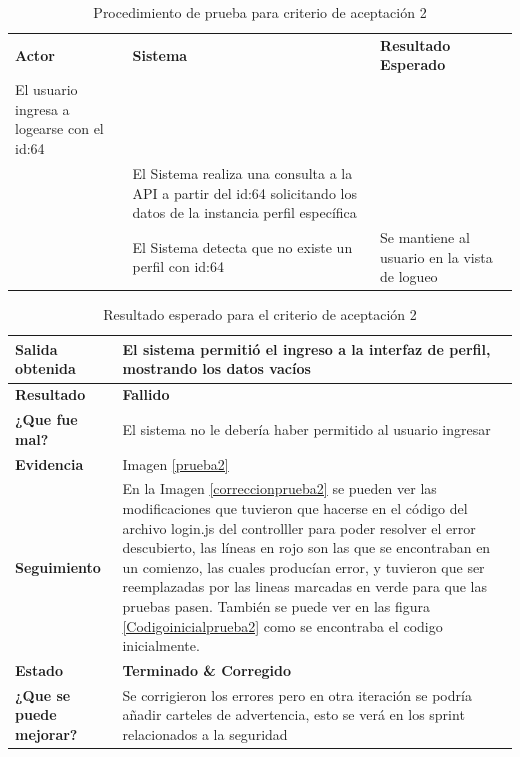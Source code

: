     {\scriptsize
        \begin{table}[h]
        \centering
	\begin{longtable}{|p{4cm}|p{6cm}|p{5cm}|}
	    \hline  \hline \rowcolor[gray]{0.9} 
        \multicolumn{3}{||l|}{\textbf{Procedimiento de Prueba - ``Consultar perfil de usuario NO existente''}} \\
        \hline \rowcolor[gray]{0.9}
	    \textbf{Actor} & \textbf{Sistema}&\textbf{Resultado Esperado} \\  \hline
	   El usuario ingresa a logearse con el id:64 & & \\ \hline
        & El Sistema realiza una consulta a la API a partir del id:64 solicitando los datos de la instancia perfil específica &   \\ \hline
        &El Sistema detecta que no existe un perfil con id:64&  Se mantiene al usuario en la vista de logueo\\ \hline
	    \end{longtable}
        \caption{Procedimiento de prueba para criterio de aceptación 2}
        
    	\end{table}
    }
    
    {\scriptsize
	\begin{table}[h]
	\centering
	\begin{longtable}{|l|p{10cm}|}
	    \hline 
	    \textbf{Salida obtenida}&El sistema permitió el ingreso a la interfaz de perfil, mostrando los datos vacíos\\ \hline
	    \textbf{Resultado}& \textbf{Fallido} \\ \hline
        \textbf{¿Que fue mal?}& El sistema no le debería haber permitido al usuario ingresar\\ \hline      
        \textbf{Evidencia}& Imagen \ref{prueba2} \\ \hline
        \textbf{Seguimiento}&  En la Imagen \ref{correccionprueba2} se pueden ver las modificaciones que tuvieron que hacerse en el código del archivo login.js del controlller para poder resolver el error descubierto, las líneas en rojo son las que se encontraban en un comienzo, las cuales producían error, y tuvieron que ser reemplazadas por las lineas marcadas en verde para que las pruebas pasen. También se puede ver en las figura \ref{Codigoinicialprueba2} como se encontraba el codigo inicialmente.\\ \hline
        \textbf{Estado}& \textbf{Terminado \& Corregido}\\ \hline        
        \textbf{¿Que se puede mejorar?}& Se corrigieron los errores pero en otra iteración se podría añadir carteles de advertencia, esto se verá en los sprint relacionados a la seguridad\\ \hline              
     
	    \end{longtable}
        \caption{Resultado esperado para el criterio de aceptación 2}
    	\end{table}
	}
    
